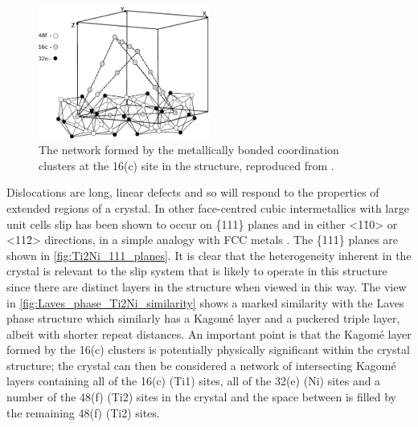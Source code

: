 \begin{figure}
\centering
\includegraphics[width=0.5\textwidth]{Ti2Ni_16c_sites}
\caption[The Kagom\'{e} network formed by atomic clusters around the 16(c) site.]{The network formed by the metallically bonded coordination clusters at the 16(c) site in the  structure, reproduced from \cite{Ivanovic2006}.\label{fig:16c_network_Ti2Ni}}
\end{figure}


Dislocations are long, linear defects and so will respond to the properties of extended regions of a crystal. In other face-centred cubic intermetallics with large unit cells slip has been shown to occur on \{111\} planes and in either <1\={1}0> or <11\={2}> directions, in a simple analogy with FCC metals \cite{Davis2015}. The \{111\} planes are shown in \autoref{fig:Ti2Ni_111_planes}. It is clear that the heterogeneity inherent in the crystal is relevant to the slip system that is likely to operate in this structure since there are distinct layers in the structure when viewed in this way. The view in \autoref{fig:Laves_phase_Ti2Ni_similarity} shows a marked similarity with the Laves phase structure which similarly has a Kagom\'{e} layer and a puckered triple layer, albeit with shorter repeat distances. An important point is that the Kagom\'{e} layer formed by the 16(c) clusters is potentially physically significant within the crystal structure; the crystal can then be considered a network of intersecting Kagom\'e layers containing all of the 16(c) (Ti1) sites, all of the 32(e) (Ni) sites and a number of the 48(f) (Ti2) sites in the crystal and the space between is filled by the remaining 48(f) (Ti2) sites.



